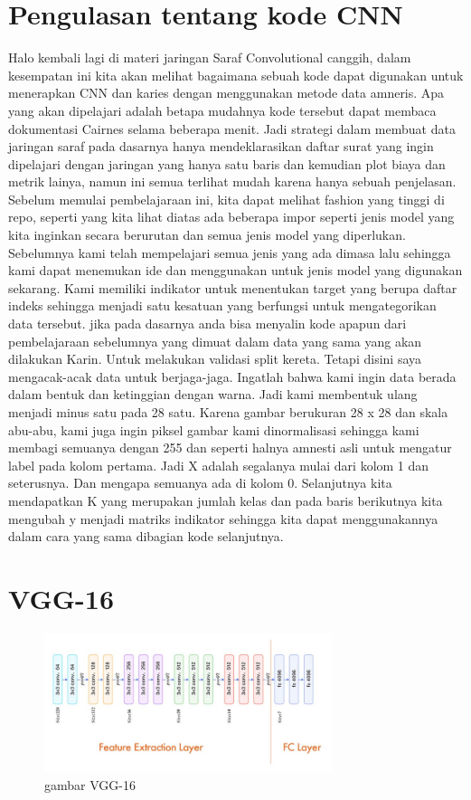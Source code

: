 \section{Pengulasan tentang kode CNN}
Halo kembali lagi di materi jaringan Saraf Convolutional canggih, dalam kesempatan ini kita akan melihat bagaimana sebuah kode dapat digunakan untuk menerapkan CNN dan karies dengan menggunakan metode data amneris. Apa yang akan dipelajari adalah betapa mudahnya kode tersebut dapat membaca dokumentasi Cairnes selama beberapa menit. Jadi strategi dalam membuat data jaringan saraf pada dasarnya hanya mendeklarasikan daftar surat yang ingin dipelajari dengan jaringan yang hanya satu baris dan kemudian plot biaya dan metrik lainya, namun ini semua terlihat mudah karena hanya sebuah penjelasan. Sebelum memulai pembelajaraan ini, kita dapat melihat fashion yang tinggi di repo, seperti yang kita lihat diatas ada beberapa impor seperti jenis model yang kita inginkan secara berurutan dan semua jenis model yang diperlukan. Sebelumnya kami telah mempelajari semua jenis yang ada dimasa lalu sehingga kami dapat menemukan ide dan menggunakan untuk jenis model yang digunakan sekarang. Kami memiliki indikator untuk menentukan target yang berupa daftar indeks sehingga menjadi satu kesatuan yang berfungsi untuk mengategorikan data tersebut. jika pada dasarnya anda bisa menyalin kode apapun dari pembelajaraan sebelumnya yang dimuat dalam data yang sama yang akan dilakukan Karin. Untuk melakukan validasi split kereta. Tetapi disini saya mengacak-acak data untuk berjaga-jaga. Ingatlah bahwa kami ingin data berada dalam bentuk dan ketinggian dengan warna. Jadi kami membentuk ulang menjadi minus satu pada 28 satu. Karena gambar berukuran 28 x 28 dan skala abu-abu, kami juga ingin piksel gambar kami dinormalisasi sehingga kami membagi semuanya dengan 255 dan seperti halnya amnesti asli untuk mengatur label pada kolom pertama. Jadi X adalah segalanya mulai dari kolom 1 dan seterusnya. Dan mengapa semuanya ada di kolom 0. Selanjutnya kita mendapatkan K yang merupakan jumlah kelas dan pada baris berikutnya kita mengubah y menjadi matriks indikator sehingga kita dapat menggunakannya dalam cara yang sama dibagian kode selanjutnya.

\section{VGG-16}
\begin{figure}[!htp]
	\includegraphics[width=0.75\textwidth]{figures/vgg.jpeg}
	\caption{gambar VGG-16}
	\label{labelgambar1}
\end{figure}


